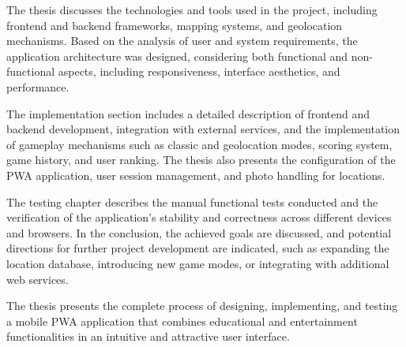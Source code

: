 The thesis discusses the technologies and tools used in the project, including frontend and backend frameworks, mapping systems, and geolocation mechanisms. Based on the analysis of user and system requirements, the application architecture was designed, considering both functional and non-functional aspects, including responsiveness, interface aesthetics, and performance.

The implementation section includes a detailed description of frontend and backend development, integration with external services, and the implementation of gameplay mechanisms such as classic and geolocation modes, scoring system, game history, and user ranking. The thesis also presents the configuration of the PWA application, user session management, and photo handling for locations.

The testing chapter describes the manual functional tests conducted and the verification of the application's stability and correctness across different devices and browsers. In the conclusion, the achieved goals are discussed, and potential directions for further project development are indicated, such as expanding the location database, introducing new game modes, or integrating with additional web services.

The thesis presents the complete process of designing, implementing, and testing a mobile PWA application that combines educational and entertainment functionalities in an intuitive and attractive user interface.
